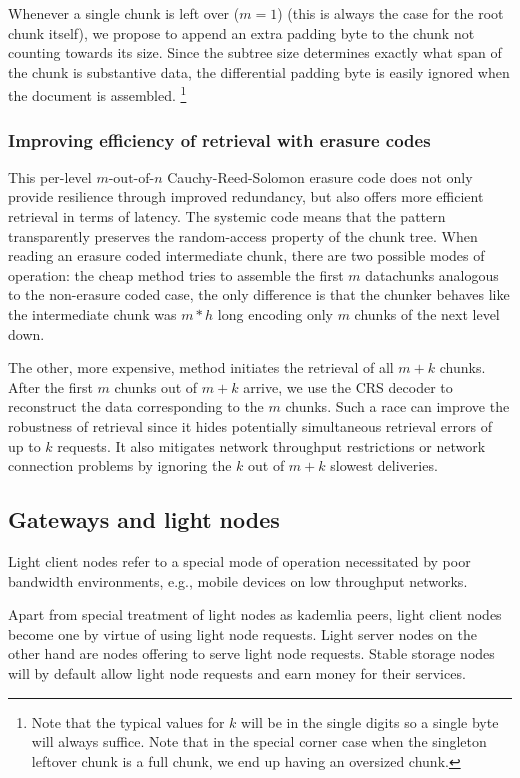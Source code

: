 Whenever a single chunk is left over ($m=1$) (this is always the case for the root chunk itself), we propose to append an extra padding byte to the chunk not counting towards its size. Since the subtree size determines exactly what span of the chunk is substantive data, the  differential padding byte is easily ignored when the document is assembled.%
%
\footnote{%
Note that the typical values for $k$ will be in the single digits so a single byte will always suffice. Note that in the special corner case when the singleton leftover chunk is a full chunk, we end up having an oversized chunk.
}

\subsubsection{Improving efficiency of retrieval with erasure codes}

This per-level $m\text{-out-of-}n$ Cauchy-Reed-Solomon erasure code does not only provide resilience through improved redundancy, but also offers more efficient retrieval in terms of latency\cite{ethersphere2016sw3}.
The systemic code means that the pattern transparently preserves the random-access property of the chunk tree. 
When reading an erasure coded intermediate chunk, there are two possible modes of operation: the cheap method tries to assemble the first $m$ datachunks analogous to the non-erasure coded case, the only difference is that the chunker behaves like the intermediate chunk was $m*h$ long encoding only $m$ chunks of the next level down. 

The other, more expensive, method initiates the retrieval of all $m+k$ chunks. After the first $m$ chunks out of $m+k$ arrive, we use the CRS decoder to reconstruct the data corresponding to the $m$ chunks. Such a race can improve the robustness of retrieval since it hides potentially simultaneous retrieval errors of up to $k$ requests. It also mitigates network throughput restrictions or network connection problems by ignoring the $k$ out of $m+k$ slowest deliveries.

\subsection{Gateways and light nodes}
\label{sec:light}

Light client nodes refer to a special mode of operation necessitated by  poor bandwidth environments, e.g., mobile devices on low throughput networks.

Apart from special treatment of light nodes as kademlia peers, light client nodes become one by virtue of using light node requests. Light server nodes on the other hand are nodes offering to serve light node requests. Stable storage nodes will by default allow light node requests and earn money for their services.

